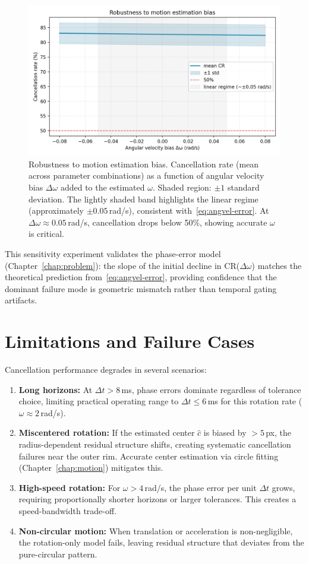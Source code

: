 \begin{figure}[t]
  \centering
  \includegraphics[width=0.85\linewidth]{images/main_results/bias_sensitivity.png}
  \caption{Robustness to motion estimation bias. Cancellation rate (mean across parameter combinations) as a function of angular velocity bias $\Delta\omega$ added to the estimated $\omega$. Shaded region: $\pm 1$ standard deviation. The lightly shaded band highlights the linear regime (approximately $\pm 0.05$\,rad/s), consistent with~\eqref{eq:angvel-error}. At $\Delta\omega \approx 0.05$\,rad/s, cancellation drops below 50\%, showing accurate $\omega$ is critical.}
  \label{fig:bias_sensitivity}
\end{figure}

This sensitivity experiment validates the phase-error model (Chapter~\ref{chap:problem}): the slope of the initial decline in CR($\Delta\omega$) matches the theoretical prediction from~\eqref{eq:angvel-error}, providing confidence that the dominant failure mode is geometric mismatch rather than temporal gating artifacts.

\section{Limitations and Failure Cases}

Cancellation performance degrades in several scenarios:

\begin{enumerate}
\item \textbf{Long horizons:} At $\Delta t > 8$\,ms, phase errors dominate regardless of tolerance choice, limiting practical operating range to $\Delta t \leq 6$\,ms for this rotation rate ($\omega \approx 2$\,rad/s).
\item \textbf{Miscentered rotation:} If the estimated center $\hat c$ is biased by $> 5$\,px, the radius-dependent residual structure shifts, creating systematic cancellation failures near the outer rim. Accurate center estimation via circle fitting (Chapter~\ref{chap:motion}) mitigates this.
\item \textbf{High-speed rotation:} For $\omega > 4$\,rad/s, the phase error per unit $\Delta t$ grows, requiring proportionally shorter horizons or larger tolerances. This creates a speed-bandwidth trade-off.
\item \textbf{Non-circular motion:} When translation or acceleration is non-negligible, the rotation-only model fails, leaving residual structure that deviates from the pure-circular pattern.
\end{enumerate}

